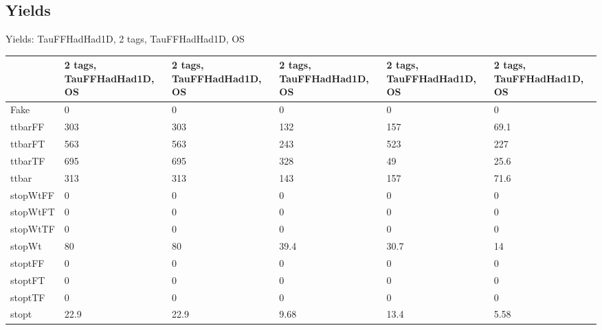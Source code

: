 
\subsection{Yields}

\begin{frame}{Yields: TauFFHadHad1D, 2 tags, TauFFHadHad1D, OS}
\begin{center}
  \begin{tabular}{l| >{\centering\let\newline\\\arraybackslash\hspace{0pt}}m{1.4cm}| >{\centering\let\newline\\\arraybackslash\hspace{0pt}}m{1.4cm}| >{\centering\let\newline\\\arraybackslash\hspace{0pt}}m{1.4cm}| >{\centering\let\newline\\\arraybackslash\hspace{0pt}}m{1.4cm}| >{\centering\let\newline\\\arraybackslash\hspace{0pt}}m{1.4cm}}
    & 2 tags, TauFFHadHad1D, OS & 2 tags, TauFFHadHad1D, OS & 2 tags, TauFFHadHad1D, OS & 2 tags, TauFFHadHad1D, OS & 2 tags, TauFFHadHad1D, OS \\
 \hline \hline
    Fake& 0 & 0 & 0 & 0 & 0 \\
 \hline
    ttbarFF& 303 & 303 & 132 & 157 & 69.1 \\
 \hline
    ttbarFT& 563 & 563 & 243 & 523 & 227 \\
 \hline
    ttbarTF& 695 & 695 & 328 & 49 & 25.6 \\
 \hline
    ttbar& 313 & 313 & 143 & 157 & 71.6 \\
 \hline
    stopWtFF& 0 & 0 & 0 & 0 & 0 \\
 \hline
    stopWtFT& 0 & 0 & 0 & 0 & 0 \\
 \hline
    stopWtTF& 0 & 0 & 0 & 0 & 0 \\
 \hline
    stopWt& 80 & 80 & 39.4 & 30.7 & 14 \\
 \hline
    stoptFF& 0 & 0 & 0 & 0 & 0 \\
 \hline
    stoptFT& 0 & 0 & 0 & 0 & 0 \\
 \hline
    stoptTF& 0 & 0 & 0 & 0 & 0 \\
 \hline
    stopt& 22.9 & 22.9 & 9.68 & 13.4 & 5.58 \\

\end{tabular}
\end{center}
\end{frame}
